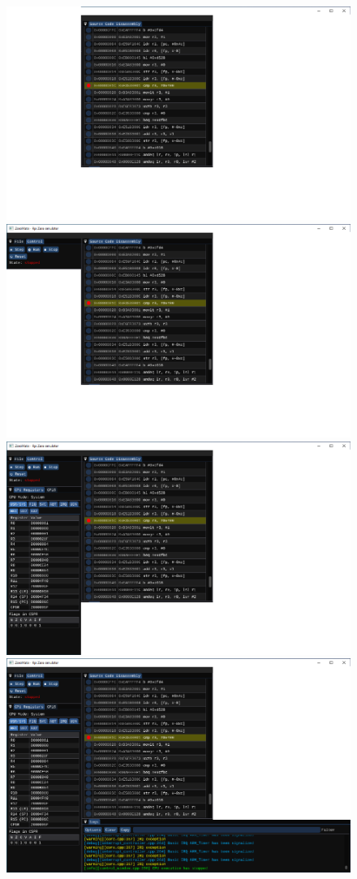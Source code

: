 \documentclass[compress]{beamer}
\begin{document}
\begin{frame}
	\centering \Large
	\begin{overlayarea}{\textwidth}{\textheight}
		\begin{figure}
			\centering
			{%
				\includegraphics[width=.85\textwidth]{img/gui/01.pdf}%
			}%
			\only<2>
			{%
				\includegraphics[width=.85\textwidth]{img/gui/02.pdf}%
			}%
			\only<3>
			{%
				\includegraphics[width=.85\textwidth]{img/gui/03.pdf}%
			}%
			\only<4>
			{%
				\includegraphics[width=.85\textwidth]{img/gui/04.pdf}%
}
\end{figure}
\end{overlayarea}
\end{frame}
\end{document}
